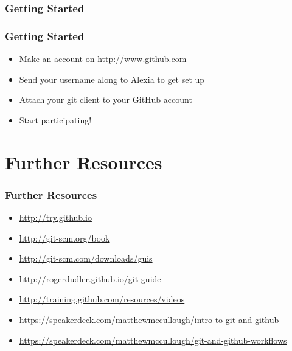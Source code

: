 \documentclass[xcolor=dvipsnames,handout]{beamer}
\begin{document}
\subsubsection{Getting Started}
\begin{frame}
  \frametitle{Getting Started}
  \begin{itemize}[<+(1)->]
  \item Make an account on \url{http://www.github.com}
  \item Send your username along to Alexia to get set up
  \item Attach your git client to your GitHub account
  \item Start participating!
  \end{itemize}
\end{frame}

\section{Further Resources}
\begin{frame}
  \frametitle{Further Resources}
  \begin{itemize}
  \item \url {http://try.github.io}
  \item \url {http://git-scm.org/book}
  \item \url {http://git-scm.com/downloads/guis}
  \item \url {http://rogerdudler.github.io/git-guide}
  \item \url {http://training.github.com/resources/videos}
  \item \url {https://speakerdeck.com/matthewmccullough/intro-to-git-and-github}
  \item \url {https://speakerdeck.com/matthewmccullough/git-and-github-workflows}
  \end{itemize}
\end{frame}
\end{document}
